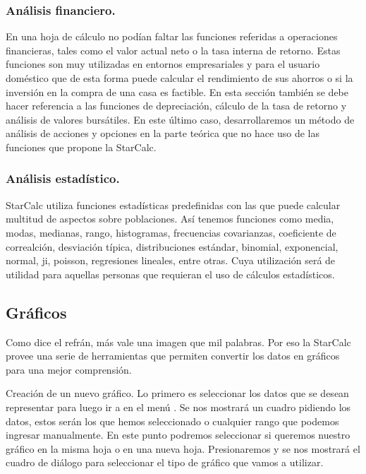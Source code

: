 \subsubsection{Análisis financiero.} 
En una hoja de cálculo no podían faltar las funciones referidas a
operaciones financieras, tales como el valor actual neto o la tasa
interna de retorno.  Estas funciones son muy utilizadas en entornos
empresariales y para el usuario doméstico que de esta forma puede
calcular el rendimiento de sus ahorros o si la inversión en la compra
de una casa es factible. En esta sección también se debe hacer
referencia a las funciones de depreciación, cálculo de la tasa de
retorno y análisis de valores bursátiles.  En este último caso,
desarrollaremos un método de análisis de acciones y opciones en la
parte teórica que no hace uso de las funciones que propone la
StarCalc.
 
\subsubsection{Análisis estadístico.} 
StarCalc utiliza funciones estadísticas predefinidas con las que puede
calcular multitud de aspectos sobre poblaciones. Así tenemos funciones
como media, modas, medianas, rango, histogramas, frecuencias
covarianzas, coeficiente de correalción, desviación típica,
distribuciones estándar, binomial, exponencial, normal, ji, poisson,
regresiones lineales, entre otras. Cuya utilización será de utilidad
para aquellas personas que requieran el uso de cálculos estadísticos.
 

\subsection{Gráficos} 
\label{Starcalc-graficos}

Como dice el refrán, más vale una imagen que mil palabras. Por eso la
StarCalc provee una serie de herramientas que permiten convertir los
datos en gráficos para una mejor comprensión.

Creación de un nuevo gráfico. Lo primero es seleccionar los datos que
se desean representar para luego ir a  en el menú
. Se nos mostrará un cuadro pidiendo los datos, estos
serán los que hemos seleccionado o cualquier rango que podemos
ingresar manualmente.  En este punto podremos seleccionar si queremos
nuestro gráfico en la misma hoja o en una nueva hoja. Presionaremos
 y se nos mostrará el cuadro de diálogo para
seleccionar el tipo de gráfico que vamos a utilizar.

